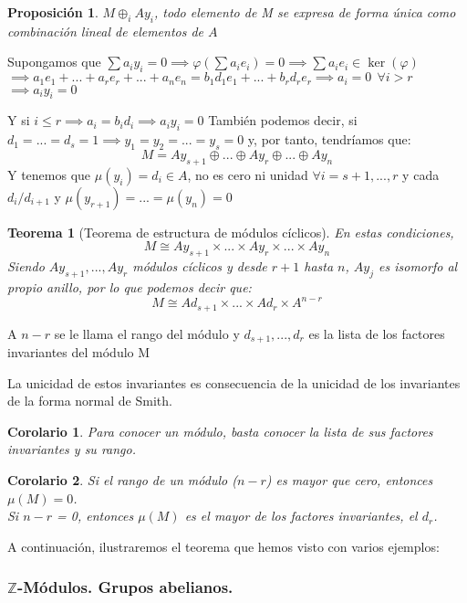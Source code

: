 \documentclass[11pt, a4paper, titlepage]{article}
\makeatletter
\newif\IfInSansMode
\let\oldsf\sffamily
\renewcommand*{\sffamily}{\oldsf\mathversion{sans}\InSansModetrue}
\let\oldnorm\normalfont
\renewcommand*{\normalfont}{\oldnorm\InSansModefalse\mathversion{normal}}
\renewenvironment{proof}[1][\proofname] {\vspace{-15pt}\par\pushQED{\qed}\normalfont\topsep6\p@\@plus6\p@\relax\trivlist\item[\hskip\labelsep\it#1\@addpunct{.}]\ignorespaces}{\popQED\endtrivlist\@endpefalse}
\providecommand{\ent}{\mathbb{Z}}
\renewenvironment{proof}[1][\proofname] {\par\pushQED{\qed}\normalfont\topsep6\p@\@plus6\p@\relax\trivlist\item[\hskip\labelsep\itshape\sffamily#1\@addpunct{.}]\ignorespaces}{\popQED\endtrivlist\@endpefalse}
\theoremstyle{theorem-style}
\newtheorem{nth}{Teorema}[section]
\newtheorem{nprop}{Proposición}[section]
\newtheorem{ncor}{Corolario}[section]
\theoremstyle{definition-style}
\theoremstyle{remark-style}
\theoremstyle{example-style}
\makeatother
\begin{document}
\begin{nprop}
	$M \oplus_i Ay_i$, todo elemento de M se expresa de forma única como combinación lineal de elementos de $A$
\end{nprop}
\begin{proof}
	Supongamos que $\sum a_i y_i = 0 \implies \varphi(\sum a_i e_i ) = 0 \implies \sum a_ie_i \in \ker (\varphi) $\\
	$\implies a_1e_1+...+ a_re_r+...+a_ne_n = b_1d_1e_1+...+b_rd_re_r \implies a_i = 0 \ \ \forall i > r$\\
	$\implies a_iy_i = 0$

	Y si $i \leq r\implies a_i = b_id_i \implies a_iy_i = 0$
\end{proof}
También podemos decir, si $d_1 = ... = d_s = 1 \implies y_1 = y_2 = ... = y_s = 0$ y, por tanto, tendríamos que:
\[
M = Ay_{s+1}  \oplus ... \oplus Ay_r \oplus ... \oplus Ay_n
\]
Y tenemos que $\mu(y_i) = d_i \in A$, no es cero ni unidad $\forall i = s+1,...,r$ y cada $d_i/d_{i+1}$ y $\mu(y_{r+1}) = ... =\mu(y_n) = 0$

\begin{nth}[Teorema de estructura de módulos cíclicos]
	En estas condiciones,
	\[
	M \cong Ay_{s+1} \times ... \times Ay_r \times ... \times Ay_n
	\]
	Siendo $Ay_{s+1},..., Ay_r$ módulos cíclicos y desde $r+1$ hasta $n$, $Ay_j$ es isomorfo al propio anillo, por lo que podemos decir que:
	\[
	M \cong Ad_{s+1}\times ... \times Ad_r \times A^{n-r}
	\]
\end{nth}

A $n-r$ se le llama el rango del módulo y $d_{s+1},...,d_r$ es la lista de los factores invariantes del módulo M

La unicidad de estos invariantes es consecuencia de la unicidad de los invariantes de la forma normal de Smith.

\begin{ncor}
	Para conocer un módulo, basta conocer la lista de sus factores invariantes y su rango.
\end{ncor}
\begin{ncor}
	Si el rango de un módulo ($n-r$) es mayor que cero, entonces $\mu(M) = 0$.\\

	Si $n-r$ = 0, entonces $\mu(M) $ es el mayor de los factores invariantes, el $d_r$.
\end{ncor}

A continuación, ilustraremos el teorema que hemos visto con varios ejemplos:

\subsubsection{$\ent$-Módulos. Grupos abelianos.}
\end{document}
